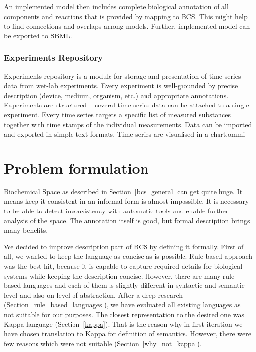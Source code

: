 \documentclass[12pt]{fithesis2}
\begin{document}
An implemented model then includes complete biological annotation of all components and reactions that is provided by mapping to BCS. This might help to find connections and overlaps among models. Further, implemented model can be exported to SBML.

\subsection{Experiments Repository}

Experiments repository is a module for storage and presentation of time-series data from wet-lab experiments. Every experiment is well-grounded by precise description (device, medium, organism, etc.) and appropriate annotations. Experiments are structured -- several time series data can be attached to a single experiment. Every time series targets a specific list of measured substances together with time stamps of the individual measurements. Data can be imported and exported in simple text formats. Time series are visualised in a chart.ommi	

\chapter{Problem formulation}
\label{problem_formulation}

Biochemical Space as described in Section~\ref{bcs_general} can get quite huge. It means keep it consistent in an informal form is almost impossible. It is necessary to be able to detect inconsistency with automatic tools and enable further analysis of the space. The annotation itself is good, but formal description brings many benefits. 

We decided to improve description part of BCS by defining it formally. First of all, we wanted to keep the language as concise as is possible. Rule-based approach was the best hit, because it is capable to capture required details for biological systems while keeping the description concise. However, there are many rule-based languages and each of them is slightly different in syntactic and semantic level and also on level of abstraction. After a deep research (Section~\ref{rule_based_languages}), we have evaluated all existing languages as not suitable for our purposes. The closest representation to the desired one was Kappa language (Section~\ref{kappa}). That is the reason why in first iteration we have chosen translation to Kappa for definition of semantics. However, there were few reasons which were not suitable (Section~\ref{why_not_kappa}).
\end{document}
